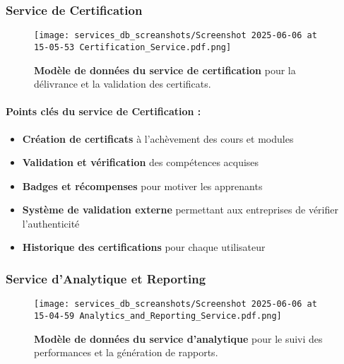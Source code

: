 \subsubsection{Service de Certification}
\begin{figure}[h!]
  \centering
  \texttt{[image: services\_db\_screanshots/Screenshot 2025-06-06 at 15-05-53 Certification\_Service.pdf.png]}
  \caption{\textbf{Modèle de données du service de certification} pour la délivrance et la validation des certificats.}
  \label{fig:certification_service}
\end{figure}
\vspace{-10pt}
\small
\paragraph{Points clés du service de Certification :}
\begin{itemize}[leftmargin=*,noitemsep,topsep=0pt]
  \item \textbf{Création de certificats} à l'achèvement des cours et modules
  \item \textbf{Validation et vérification} des compétences acquises
  \item \textbf{Badges et récompenses} pour motiver les apprenants
  \item \textbf{Système de validation externe} permettant aux entreprises de vérifier l'authenticité
  \item \textbf{Historique des certifications} pour chaque utilisateur
\end{itemize}
\normalsize
\newpage

\subsubsection{Service d'Analytique et Reporting}
\begin{figure}[h!]
  \centering
  \texttt{[image: services\_db\_screanshots/Screenshot 2025-06-06 at 15-04-59 Analytics\_and\_Reporting\_Service.pdf.png]}
  \caption{\textbf{Modèle de données du service d'analytique} pour le suivi des performances et la génération de rapports.}
  \label{fig:analytics_service}
\end{figure}
\vspace{-10pt}
\small

